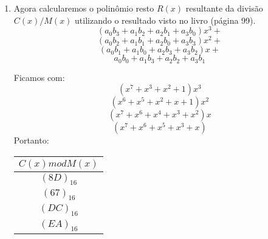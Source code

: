 \documentclass[12pt]{article}
\begin{document}
\begin{enumerate}
				$(x^7 + x^3 + x^2 + 1)x^5 +$\\
				$(x^6 + x^5 + x^4 + x^2 + 1)x^4 +$\\
				$(x^7 + x^4 + x^2)x^4 +$\\
				$(x^7 + x^5 + x^4 + x^3 + x^2 + 1)x^4 +$\\
				$(x^6 + x^3 + 1)x^3 +$\\
				$(x^7 + x^6 + x^5 + x^4)x^3 +$\\
				$(x^7 + x^5 + x^4 + x + 1)x^3 +$\\
				$(x^7 + x^2 + x + 1)x^3 +$\\
				$(x^5 + x^4 + x^2 + x + 1)x^2 +$\\
				$(x^7 + x^3 + x + 1)x^2 +$\\
				$(x^6 + x^5 + x^4 + 1)x^2 +$\\
				$(x^7 + x^6 + x^5 + x)x +$\\
				$(x^7 + x^2)x +$\\
				$(x^7 + x^5 + x^4 + x^2 + x) $\\
				Mostrando $C(x)$ com coeficientes em hexadecimal temos:\\
				$C(x) = (AA)x^6 + (37)x^5 + (8D)x^5 + (75)x^4 + (94)x^4 + (BD)x^4 + (49)x^3 + (F0)x^3 + (B3)x^3 + (87)x^3 + (37)x^2
				+ (8B)x^2 + (71)x^2 + (E2)x + (84)x + (B6)$
			\item
				Agora calcularemos o polinômio resto $R(x)$ resultante da divisão $C(x)/M(x)$ utilizando
				o resultado visto no livro (página 99).
				$$(a_0b_3 + a_1b_2 + a_2b_1 + a_3b_0)x^3 +$$
				$$(a_0b_2 + a_1b_1 + a_2b_0 + a_3b_3)x^2 +$$
				$$(a_0b_1 + a_1b_0 + a_2b_3 + a_3b_2)x +$$
				$$a_0b_0 + a_1b_3 + a_2b_2 + a_3b_1$$
				
				Ficamos com:
				$$(x^7 + x^3 + x^2 + 1)x^3$$
				$$(x^6 + x^5 + x^2 + x + 1)x^2$$
				$$(x^7 + x^6 + x^4 + x^3 + x^2)x$$
				$$(x^7 + x^6 + x^5 + x^3 + x)$$
				Portanto:
				\begin{table}[h]
					\centering
					\vspace{0.5cm}
					\begin{tabular}{c}
					$C(x) mod M(x)$\\
					\hline                               
						$(8D)_{16}$\\
						$(67)_{16}$\\
						$(DC)_{16}$\\
						$(EA)_{16}$\\
					\end{tabular}
				\end{table}
		\end{enumerate}
	\newpage		
\end{document}
